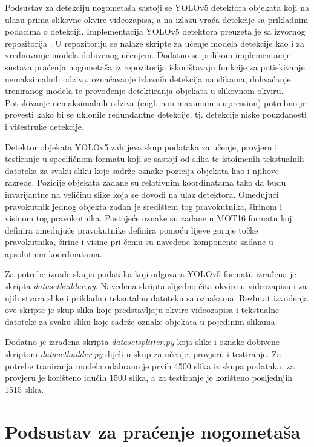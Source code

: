 \documentclass[times, utf8, seminar, numeric]{fer}
\begin{document}
Podsustav za detekciju nogometaša sastoji se YOLOv5 detektora objekata koji na ulazu prima slikovne okvire videozapisa, a na izlazu vraća detekcije sa prikladnim podacima o detekciji. 
Implementacija YOLOv5 detektora preuzeta je sa izvornog repozitorija \cite{yolov5impl}. U repozitoriju se nalaze skripte za učenje modela detekcije kao i za vrednovanje modela dobivenog učenjem. Dodatno se prilikom implementacije sustava praćenja nogometaša iz repozitorija iskorištavaju funkcije za potiskivanje nemaksimalnih odziva, označavanje izlaznih detekcija na slikama, dohvaćanje treniranog modela te provođenje detektiranja objekata u slikovnom okviru. 
Potiskivanje nemaksimalnih odziva (engl. non-maximum surpression) potrebno je provesti kako bi se uklonile redundantne detekcije, tj. detekcije niske pouzdanosti i višestruke detekcije. 



Detektor objekata YOLOv5 zahtjeva skup podataka za učenje, provjeru i testiranje u specifičnom formatu koji se sastoji od slika te istoimenih tekstualnih datoteka za svaku sliku koje sadrže oznake pozicija objekata kao i njihove razrede. Pozicije objekata zadane su relativnim koordinatama tako da budu invarijantne na veličinu slike koja se dovodi na ulaz detektora. Omeđujući pravokutnik jednog objekta zadan je središtem tog pravokutnika, širinom i visinom tog pravokutnika. Postojeće oznake su zadane u MOT16 formatu koji definira omeđujuće pravokutnike definira pomoću lijeve gornje točke pravokutnika, širine i visine pri čemu su navedene komponente zadane u apsolutnim koordinatama.

Za potrebe izrade skupa podataka koji odgovara YOLOv5 formatu izrađena je skripta \textit{dataset\textunderscore builder.py}. Navedena skripta slijedno čita okvire u videozapisu i za njih stvara slike i prikladnu teksutalnu datoteku sa oznakama. Rezlutat izvođenja ove skripte je skup slika koje predstavljaju okvire videozapisa i tekstualne datoteke za svaku sliku koje sadrže oznake objekata u pojedinim slikama.

Dodatno je izrađena skripta \textit{dataset\textunderscore splitter.py} koja slike i oznake dobivene skriptom \textit{dataset\textunderscore builder.py} dijeli u skup za učenje, provjeru i testiranje. Za potrebe traniranja modela odabrano je prvih 4500 slika iz skupa podataka, za provjeru je korišteno idućih 1500 slika, a za testiranje je korišteno posljednjih 1515 slika. 


\section{Podsustav za praćenje nogometaša}
\end{document}

